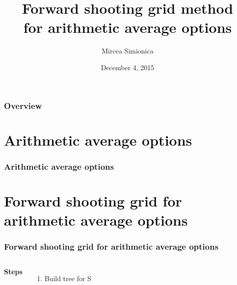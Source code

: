 \documentclass{beamer}
\title[Forward shooting grid]{Forward shooting grid method \\ for arithmetic average options} %
\author{Mircea Simionica} %
\institute[] %
{
\medskip
\textit{Applied Numerical Finance assignment} %
}
\date{December 4, 2015} %
\begin{document}
\begin{frame}
\titlepage %
\end{frame}

\begin{frame}
\frametitle{Overview} %
\tableofcontents %
\end{frame}

\section{Arithmetic average options} %
\begin{frame}
\frametitle{Arithmetic average options}
\end{frame}
\section{Forward shooting grid for arithmetic average options} %
\begin{frame}
\frametitle{Forward shooting grid for arithmetic average options}
\begin{columns}[c] %

\textbf{Steps}
\begin{enumerate}
\item Build tree for S
\end{enumerate}



\end{columns}
\end{frame}
\end{document}
